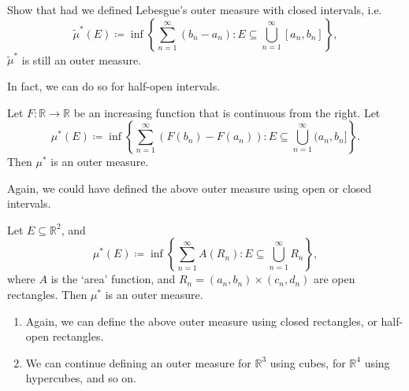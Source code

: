 \documentclass[notoc,notitlepage]{tufte-book}
\begin{document}
\begin{ex}
  Show that had we defined Lebesgue's outer measure with closed intervals,
  i.e.
  \begin{equation*}
    \tilde{\mu}^*(E) \coloneqq \inf \left\{ 
      \sum_{n=1}^{\infty} (b_n - a_n)
        : E \subseteq \bigcup_{n=1}^{\infty} [a_n, b_n]
    \right\},
  \end{equation*}
  $\tilde{\mu}^*$ is still an outer measure.

  In fact, we can do so for half-open intervals.
\end{ex}

\begin{eg}\label{eg:lebesgue_stieltjes_outer_measure}
  Let $F : \mathbb{R} \to \mathbb{R}$ be an increasing function
  that is continuous from the right.
  Let
  \begin{equation*}
    \mu^*(E) \coloneqq \inf \left\{ 
      \sum_{n=1}^{\infty} ( F(b_n) - F(a_n) )
      : E \subseteq \bigcup_{n=1}^{\infty} (a_n, b_n]
    \right\}.
  \end{equation*}
  Then $\mu^*$ is an outer measure.
\end{eg}

\begin{remark}
  Again, we could have defined the above outer measure using 
  open or closed intervals.
\end{remark}

\begin{eg}
  Let $E \subseteq \mathbb{R}^2$, and
  \begin{equation*}
    \mu^*(E) \coloneqq \inf \left\{ 
      \sum_{n=1}^{\infty} A(R_n)
        : E \subseteq \bigcup_{n=1}^{\infty} R_n
    \right\},
  \end{equation*}
  where $A$ is the `area' function, and $R_n = (a_n, b_n) \times (c_n, d_n)$
  are open rectangles.
  Then $\mu^*$ is an outer measure.
\end{eg}

\begin{remark}
  \begin{enumerate}
    \item Again, we can define the above outer measure using closed rectangles,
      or half-open rectangles.
    \item We can continue defining an outer measure for
      $\mathbb{R}^3$ using cubes,
      for $\mathbb{R}^4$ using hypercubes, and so on.
  \end{enumerate}
\end{remark}
\end{document}
